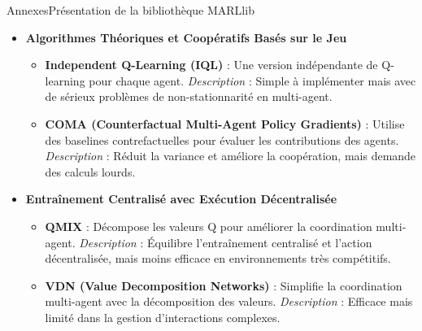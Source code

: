 \begin{frame}[allowframebreaks]{Annexes}{Présentation de la bibliothèque MARLlib}
\begin{itemize}
        \item \textbf{Algorithmes Théoriques et Coopératifs Basés sur le Jeu}  
        \begin{itemize}
            \item \textbf{Independent Q-Learning (IQL)} : Une version indépendante de Q-learning pour chaque agent.  
            \textit{Description} : Simple à implémenter mais avec de sérieux problèmes de non-stationnarité en multi-agent.
            \item \textbf{COMA (Counterfactual Multi-Agent Policy Gradients)} : Utilise des baselines contrefactuelles pour évaluer les contributions des agents.  
            \textit{Description} : Réduit la variance et améliore la coopération, mais demande des calculs lourds.
        \end{itemize}
    
        \item \textbf{Entraînement Centralisé avec Exécution Décentralisée}  
        \begin{itemize}
            \item \textbf{QMIX} : Décompose les valeurs Q pour améliorer la coordination multi-agent.  
            \textit{Description} : Équilibre l'entraînement centralisé et l'action décentralisée, mais moins efficace en environnements très compétitifs.
            \item \textbf{VDN (Value Decomposition Networks)} : Simplifie la coordination multi-agent avec la décomposition des valeurs.  
            \textit{Description} : Efficace mais limité dans la gestion d'interactions complexes.
        \end{itemize}
    \end{itemize}
    

\end{frame}